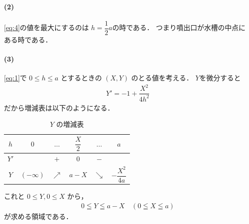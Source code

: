 \documentclass[../../main.tex]{subfiles}
\begin{document}
\paragraph{(2)}

\cref{eq:4}の値を最大にするのは $h = \dfrac{1}{2}a$の時である．
つまり噴出口が水槽の中点にある時である．

\paragraph{(3)}

\cref{eq:1}で $0 \le h \le a$ とするときの $(X,Y)$ のとる値を考える．
$Y$を微分すると
\begin{align}
  Y' = -1 + \dfrac{X^2}{4h^2}
\end{align}
だから増減表は以下のようになる．

\begin{table}[htb]
  \centering
  \caption{$Y$ の増減表}
  \begin{tabular}{c|ccccc}
    $h$ & $0$ & $\dots$ & $\dfrac{X}{2}$ & $\dots$ & $a$ \\
    \hline
    $Y'$ & & $+$ & $0$ & $-$ & \\
    \hline
    $Y$ & $(-\infty)$ & $\nearrow$ & $a-X$ & $\searrow$ & $-\dfrac{X^2}{4a}$
  \end{tabular}
\end{table}

これと $0 \le Y, 0 \le X$ から，
\begin{align}
  0 \leqq Y \leqq a - X \quad (0\leqq X \leqq a)
\end{align}
が求める領域である．
\end{document}
